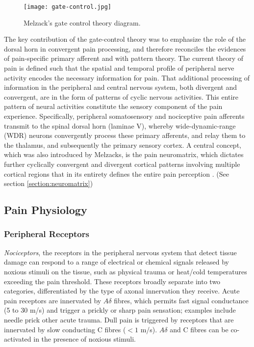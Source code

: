  \begin{figure}[ht]
 \texttt{[image: gate-control.jpg]}
 \centering
 \caption{Melzack's gate control theory diagram.}
 \label{fig:gate-theory} 
 \end{figure}
 
The key contribution of the gate-control theory was to emphasize the role of the dorsal horn in convergent pain processing, and therefore reconciles the evidences of pain-specific primary afferent and with pattern theory. The current theory of pain is defined such that the spatial and temporal profile of peripheral nerve activity encodes the necessary information for pain. That additional processing of information in the peripheral and central nervous system, both divergent and convergent, are in the form of patterns of cyclic nervous activities. This entire pattern of neural activities constitute the sensory component of the pain experience. Specifically, peripheral somatosensory and nociceptive pain afferents transmit to the spinal dorsal horn (laminae V), whereby wide-dynamic-range (WDR) neurons convergently process these primary afferents, and relay them to the thalamus, and subsequently the primary sensory cortex. A central concept, which was also introduced by Melzacks, is the pain neuromatrix, which dictates further cyclically convergent and divergent cortical patterns involving multiple cortical regions that in its entirety defines the entire pain perception \cite{Melzack1999}. (See section \ref{section:neuromatrix})


\subsection{Pain Physiology}

\subsubsection{Peripheral Receptors}

\textit{Nociceptors}, the receptors in the peripheral nervous system that detect tissue damage can respond to a range of electrical or chemical signals released by noxious stimuli on the tissue, such as physical trauma or heat/cold temperatures exceeding the pain threshold. These receptors broadly separate into two categories, differentiated by the type of axonal innervation they receive. Acute pain receptors are innervated by $A\delta$ fibres, which permits fast signal conductance (5 to 30 m/s) and trigger a prickly or sharp pain sensation; examples include needle prick other acute trauma. Dull pain is triggered by receptors that are innervated by slow conducting C fibres ($<1$ m/s). $A\delta$ and C fibres can be co-activated in the presence of noxious stimuli. 

